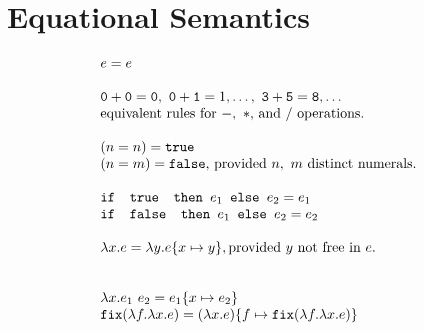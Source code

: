 \section{Equational Semantics}
\begin{figure}[H]
\[
\begin{array}{lr}
e = e \\ \\
\texttt{0} + \texttt{0} = \texttt{0}, \ \texttt{0} + \texttt{1} = 1, \ldots, \ \texttt{3} + \texttt{5} = \texttt{8}, \ldots  \\
\text{equivalent rules for } -, \ * \text{, and } /\text{ operations.}
\\ \\
(n =n) = \texttt{true} \\ (n=m) = \texttt{false}\text{, provided } n, \ m \text{ distinct numerals.}\\ \\ 
\ifelse{\texttt{ true }}{e_1}{e_2} = e_1 \\
\ifelse{\texttt{ false }}{e_1}{e_2} = e_2 \\ \\ 
\lambda x.e = \lambda y.e\{x \mapsto y \}, \text{provided } y \text{ not free in } e. \\ \\ \\
\lambda x.e_1 \ e_2 = e_1\{x \mapsto e_2\} \\
\texttt{fix}(\lambda f. \lambda x.e) = (\lambda x.e)\{f \mapsto \texttt{fix}(\lambda f.\lambda x.e)\}
\end{array}
\]
\end{figure}

